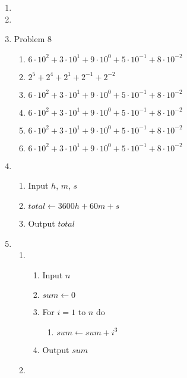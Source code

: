 \begin{enumerate}[leftmargin=2cm,labelsep=.5cm,label=\bf\arabic*.]
\item

\item

\item Problem 8
\begin{enumerate}
  \item $6 \cdot 10^2 + 3 \cdot 10^1 + 9 \cdot 10^0 + 5 \cdot 10^{-1} + 8 \cdot 10^{-2}$
  \item $2^5 + 2^4 + 2^1 + 2^{-1} + 2^{-2}$
  \item $6 \cdot 10^2 + 3 \cdot 10^1 + 9 \cdot 10^0 + 5 \cdot 10^{-1} + 8 \cdot 10^{-2}$
  \item $6 \cdot 10^2 + 3 \cdot 10^1 + 9 \cdot 10^0 + 5 \cdot 10^{-1} + 8 \cdot 10^{-2}$
  \item $6 \cdot 10^2 + 3 \cdot 10^1 + 9 \cdot 10^0 + 5 \cdot 10^{-1} + 8 \cdot 10^{-2}$
  \item $6 \cdot 10^2 + 3 \cdot 10^1 + 9 \cdot 10^0 + 5 \cdot 10^{-1} + 8 \cdot 10^{-2}$\\[1cm]
\end{enumerate}
\item
\begin{enumerate}[label=\arabic*.]
  \item Input $h$, $m$, $s$
  \item $total\leftarrow 3600h + 60m + s$
  \item Output $total$\\[1cm]
\end{enumerate}
\newpage
\item
\begin{enumerate}
  \item
  \begin{enumerate}[label=\arabic*.]
    \item Input $n$
    \item $sum\leftarrow 0$
    \item For $i = 1$ to $n$ do
    \begin{enumerate}[leftmargin=1cm,label*=\arabic*]
      \item $sum\leftarrow sum + i^3$
    \end{enumerate}
    \item Output $sum$\\[5mm]
  \end{enumerate}
  \item
  \begin{enumerate}[label=\arabic*.]

\end{enumerate}
\end{enumerate}
\end{enumerate}
